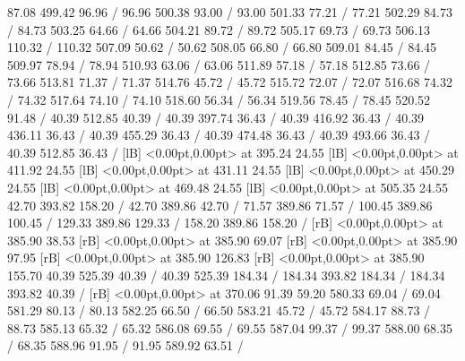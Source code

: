{ 87.08 499.42 96.96 /
 96.96 500.38 93.00 /
 93.00 501.33 77.21 /
 77.21 502.29 84.73 /
 84.73 503.25 64.66 /
 64.66 504.21 89.72 /
 89.72 505.17 69.73 /
 69.73 506.13 110.32 /
 110.32 507.09 50.62 /
 50.62 508.05 66.80 /
 66.80 509.01 84.45 /
 84.45 509.97 78.94 /
 78.94 510.93 63.06 /
 63.06 511.89 57.18 /
 57.18 512.85 73.66 /
 73.66 513.81 71.37 /
 71.37 514.76 45.72 /
 45.72 515.72 72.07 /
 72.07 516.68 74.32 /
 74.32 517.64 74.10 /
 74.10 518.60 56.34 /
 56.34 519.56 78.45 /
 78.45 520.52 91.48 /
\setsolid
{} 40.39 512.85 40.39 /
\setsolid
{} 40.39 397.74 36.43 /
\setsolid
{} 40.39 416.92 36.43 /
\setsolid
{} 40.39 436.11 36.43 /
\setsolid
{} 40.39 455.29 36.43 /
\setsolid
{} 40.39 474.48 36.43 /
\setsolid
{} 40.39 493.66 36.43 /
\setsolid
{} 40.39 512.85 36.43 /
  [lB] <0.00pt,0.00pt> at 395.24 24.55
  [lB] <0.00pt,0.00pt> at 411.92 24.55
  [lB] <0.00pt,0.00pt> at 431.11 24.55
  [lB] <0.00pt,0.00pt> at 450.29 24.55
  [lB] <0.00pt,0.00pt> at 469.48 24.55
  [lB] <0.00pt,0.00pt> at 505.35 24.55
\setsolid
{} 42.70 393.82 158.20 /
\setsolid
{} 42.70 389.86 42.70 /
\setsolid
{} 71.57 389.86 71.57 /
\setsolid
{} 100.45 389.86 100.45 /
\setsolid
{} 129.33 389.86 129.33 /
\setsolid
{} 158.20 389.86 158.20 /
 [rB] <0.00pt,0.00pt> at 385.90 38.53
 [rB] <0.00pt,0.00pt> at 385.90 69.07
 [rB] <0.00pt,0.00pt> at 385.90 97.95
 [rB] <0.00pt,0.00pt> at 385.90 126.83
 [rB] <0.00pt,0.00pt> at 385.90 155.70
\setsolid
{} 40.39 525.39 40.39 /
 40.39 525.39 184.34 /
 184.34 393.82 184.34 /
 184.34 393.82 40.39 /
 [rB] <0.00pt,0.00pt> at 370.06 91.39
\setsolid
{} 59.20 580.33 69.04 /
 69.04 581.29 80.13 /
 80.13 582.25 66.50 /
 66.50 583.21 45.72 /
 45.72 584.17 88.73 /
 88.73 585.13 65.32 /
 65.32 586.08 69.55 /
 69.55 587.04 99.37 /
 99.37 588.00 68.35 /
 68.35 588.96 91.95 /
 91.95 589.92 63.51 /
}
